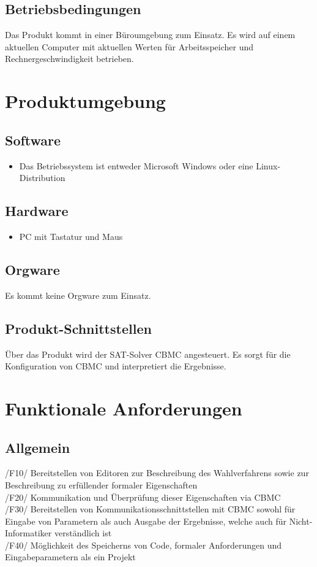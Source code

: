 \documentclass[a4paper]{scrreprt}
\begin{document}
\section{Betriebsbedingungen}
Das Produkt kommt in einer Büroumgebung zum Einsatz. Es wird auf einem aktuellen Computer mit aktuellen Werten für Arbeitsspeicher und Rechnergeschwindigkeit betrieben.


\chapter{Produktumgebung}

\section{Software}
\begin{itemize}
\item Das Betriebssystem ist entweder Microsoft Windows oder eine Linux-Distribution
\end{itemize}

\section{Hardware}
\begin{itemize}
\item PC mit Tastatur und Maus
\end{itemize}

\section{Orgware}
Es kommt keine Orgware zum Einsatz.

\section{Produkt-Schnittstellen}
Über das Produkt wird der SAT-Solver CBMC angesteuert. Es sorgt für die Konfiguration von CBMC und interpretiert die Ergebnisse.



\chapter{Funktionale Anforderungen}
\section{Allgemein}
/F10/ Bereitstellen von Editoren zur Beschreibung des Wahlverfahrens sowie zur Beschreibung zu erfüllender formaler Eigenschaften \\
/F20/ Kommunikation und Überprüfung dieser Eigenschaften via CBMC \\
/F30/ Bereitstellen von Kommunikationsschnittstellen mit CBMC sowohl für Eingabe von Parametern als auch Ausgabe der Ergebnisse, welche auch für Nicht-Informatiker verständlich ist \\
/F40/ Möglichkeit des Speicherns von Code, formaler Anforderungen und Eingabeparametern als ein Projekt \\
\end{document}
